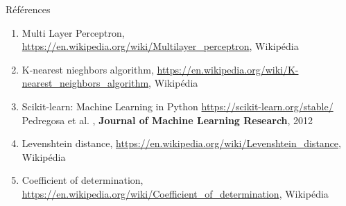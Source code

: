 \documentclass{beamer}
\begin{document}
\begin{frame}{Références}
    \begin{enumerate}
        \item Multi Layer Perceptron, \url{https://en.wikipedia.org/wiki/Multilayer_perceptron}, Wikipédia

        \item K-nearest nieghbors algorithm, \url{https://en.wikipedia.org/wiki/K-nearest_neighbors_algorithm}, Wikipédia

        \item Scikit-learn: Machine Learning in Python \url{https://scikit-learn.org/stable/} Pedregosa et al. , \textbf{Journal of Machine Learning Research}, 2012

        \item Levenshtein distance, \url{https://en.wikipedia.org/wiki/Levenshtein_distance}, Wikipédia

        \item Coefficient of determination, \url{https://en.wikipedia.org/wiki/Coefficient_of_determination}, Wikipédia
    \end{enumerate}
\end{frame}
\end{document}
